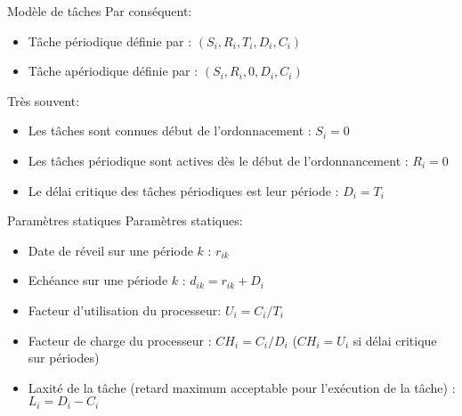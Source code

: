 \begin{frame}{Modèle de tâches}
  Par conséquent: 
  \begin{itemize} 
  \item Tâche périodique définie par : $(S_i, R_i, T_i ,D_i, C_i)$
  \item Tâche apériodique définie par : $(S_i, R_i, 0, D_i, C_i)$
  \end{itemize} 
  Très souvent:
  \begin{itemize}
    \item Les tâches sont connues début de l'ordonnacement : $S_i = 0$
    \item Les tâches périodique sont actives dès le début de
      l'ordonnancement : $R_i = 0$
    \item Le délai critique des  tâches périodiques est leur période  : $D_i =
      T_i$
  \end{itemize}
\end{frame}

\begin{frame}{Paramètres statiques}
  Paramètres statiques:
  \begin{itemize} 
  \item Date de réveil sur une période $k$ : $r_{ik}$
  \item Echéance sur une période $k$ : $d_{ik} = r_{ik} + D_i$
  \item Facteur d'utilisation du processeur: $U_i =  C_i / T_i$
  \item Facteur de charge du processeur : $CH_i = C_i / D_i $ ($CH_i =
    U_i$ si délai critique sur périodes)
  \item Laxité de la tâche (retard maximum acceptable pour l'exécution
    de la tâche) : $L_i = D_i - C_i$
  \end{itemize} 
\end{frame}

